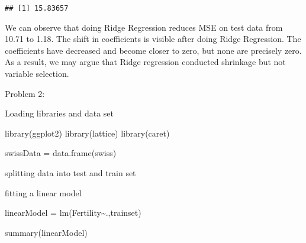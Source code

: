 \documentclass[
]{article}
\newenvironment{Shaded}{\begin{snugshade}}{\end{snugshade}}
\newcommand{\AttributeTok}[1]{\textcolor[rgb]{0.77,0.63,0.00}{#1}}
\newcommand{\DecValTok}[1]{\textcolor[rgb]{0.00,0.00,0.81}{#1}}
\newcommand{\FloatTok}[1]{\textcolor[rgb]{0.00,0.00,0.81}{#1}}
\newcommand{\FunctionTok}[1]{\textcolor[rgb]{0.00,0.00,0.00}{#1}}
\newcommand{\NormalTok}[1]{#1}
\newcommand{\OtherTok}[1]{\textcolor[rgb]{0.56,0.35,0.01}{#1}}
\newcommand{\SpecialCharTok}[1]{\textcolor[rgb]{0.00,0.00,0.00}{#1}}
\begin{document}
\begin{verbatim}
## [1] 15.83657
\end{verbatim}

We can observe that doing Ridge Regression reduces MSE on test data from
10.71 to 1.18. The shift in coefficients is visible after doing Ridge
Regression. The coefficients have decreased and become closer to zero,
but none are precisely zero. As a result, we may argue that Ridge
regression conducted shrinkage but not variable selection.

Problem 2:

Loading libraries and data set

\begin{Shaded}
\begin{Highlighting}[]
\FunctionTok{library}\NormalTok{(ggplot2)}
\FunctionTok{library}\NormalTok{(lattice)}
\FunctionTok{library}\NormalTok{(caret)}

\NormalTok{swissData }\OtherTok{=} \FunctionTok{data.frame}\NormalTok{(swiss)}
\end{Highlighting}
\end{Shaded}

splitting data into test and train set

\begin{Shaded}
\end{Shaded}

fitting a linear model

\begin{Shaded}
\begin{Highlighting}[]
\NormalTok{linearModel }\OtherTok{=} \FunctionTok{lm}\NormalTok{(Fertility}\SpecialCharTok{\textasciitilde{}}\NormalTok{.,trainset)}

\FunctionTok{summary}\NormalTok{(linearModel)}
\end{Highlighting}
\end{Shaded}
\end{document}
